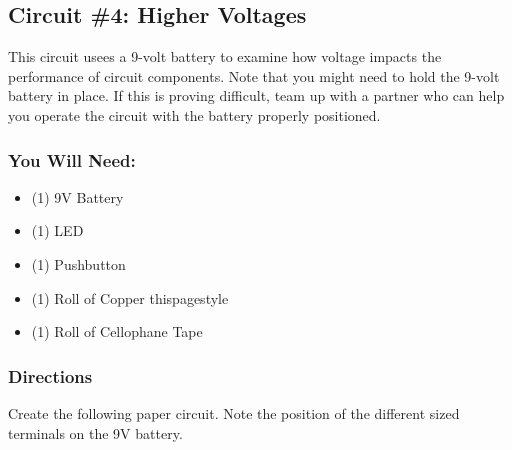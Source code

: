     \subsection{Circuit \#4: Higher Voltages}
    This circuit usees a 9-volt battery to examine how voltage impacts the performance of circuit components. Note that you might need to hold the 9-volt battery in place. If this is proving difficult, team up with a partner who can help you operate the circuit with the battery properly positioned.

    \subsubsection*{You Will Need:}
    \begin{itemize}[noitemsep]\small
        \item (1) 9V Battery
        \item (1) LED
        \item (1) Pushbutton
        \item (1) Roll of Copper thispagestyle
        \item (1) Roll of Cellophane Tape
    \end{itemize}

    \subsubsection*{Directions}
    Create the following paper circuit. Note the position of the different sized terminals on the 9V battery.


